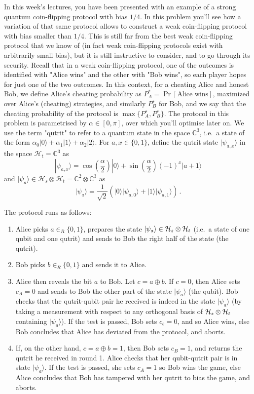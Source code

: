 \documentclass[a4paper,10pt,landscape,twocolumn]{scrartcl}
\newcommand{\ket}[1]{| #1 \rangle}
\begin{document}
\begin{exercise} %
In this week's lectures, you have been presented with an example of a strong quantum coin-flipping protocol with bias $1/4$. In this problem you'll see how a variation of that same protocol allows to construct a weak coin-flipping protocol with bias smaller than $1/4$. This is still far from the best weak coin-flipping protocol that we know of (in fact weak coin-flipping protocols exist with arbitrarily small bias), but it is still instructive to consider, and to go through its security. 
Recall that in a weak coin-flipping protocol, one of the outcomes is identified with "Alice wins" and the other with "Bob wins", so each player hopes for just one of the two outcomes. In this context, for a cheating Alice and honest Bob, we define Alice's cheating probability as $P^*_A=\Pr[\text{Alice wins}]$, maximized over Alice's (cheating) strategies, and similarly $P_B^∗$ for Bob, and we say that the cheating probability of the protocol is $\max\{P_A^∗,P_B^∗\}$. The protocol in this problem is parametrised by $\alpha \in [0,\pi]$, over which you'll optimise later on. 
We use the term "qutrit" to refer to a quantum state in the space $\mathbb{C}^3$, i.e.\ a state of the form $\alpha_0\ket{0}+\alpha_1\ket{1} + \alpha_2 \ket{2}$. For $a,x \in \{0,1\}$, define the qutrit state $\ket{\psi_{a,x}}$ in the space $\mathcal{H}_t = \mathbb{C}^3$ as
\[
\ket{\psi_{a,x}} = \cos(\frac{\alpha}{2}) \ket{0} + \sin(\frac{\alpha}{2}) (-1)^x \ket{a+1}
\]
and $\ket{\psi_a} \in \mathcal{H}_s \otimes \mathcal{H}_t = \mathbb{C}^2 \otimes \mathbb{C}^3$ as 
\[
\ket{\psi_a} = \frac{1}{\sqrt{2}} ( \ket{0} \ket{\psi_{a,0}} + \ket{1} \ket{\psi_{a,1}} ) \, .
\]

The protocol runs as follows:
\begin{enumerate}
\item Alice picks $a \in_R \{0,1\}$, prepares the state $\ket{\psi_a} \in \mathcal{H}_s \otimes \Hi_t$ (i.e.\ a state of one qubit and one qutrit) and sends to Bob the right half of the state (the qutrit).
\item Bob picks $b \in_R \{0,1\}$ and sends it to Alice.
\item Alice then reveals the bit $a$ to Bob. Let $c=a \oplus b$. If $c=0$, then Alice sets $c_A=0$ and sends to Bob the other part of the state $\ket{\psi_a}$ (the qubit). Bob checks that the qutrit-qubit pair he received is indeed in the state $\ket{\psi_a}$ (by taking a measurement with respect to any orthogonal basis of $\mathcal{H}_s \otimes \mathcal{H}_t$ containing $\ket{\psi_a}$). If the test is passed, Bob sets $c_b=0$, and so Alice wins, else Bob concludes that Alice has deviated from the protocol, and aborts.
\item If, on the other hand, $c=a \oplus b=1$, then Bob sets $c_B=1$, and returns the qutrit he received in round 1. Alice checks that her qubit-qutrit pair is in state $\ket{\psi_a}$. If the test is passed, she sets $c_A=1$ so Bob wins the game, else Alice concludes that Bob has tampered with her qutrit to bias the game, and aborts.
\end{enumerate}


\end{exercise}
\end{document}
